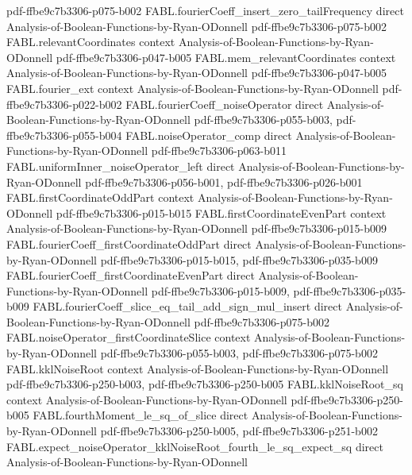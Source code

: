 \begin{theorem}
  {pdf-ffbe9c7b3306-p075-b002}
\proofstep
  {FABL.fourierCoeff_insert_zero_tailFrequency}
  {direct}
  {Analysis-of-Boolean-Functions-by-Ryan-ODonnell}
  {pdf-ffbe9c7b3306-p075-b002}
\proofstep
  {FABL.relevantCoordinates}
  {context}
  {Analysis-of-Boolean-Functions-by-Ryan-ODonnell}
  {pdf-ffbe9c7b3306-p047-b005}
\proofstep
  {FABL.mem_relevantCoordinates}
  {context}
  {Analysis-of-Boolean-Functions-by-Ryan-ODonnell}
  {pdf-ffbe9c7b3306-p047-b005}
\proofstep
  {FABL.fourier_ext}
  {context}
  {Analysis-of-Boolean-Functions-by-Ryan-ODonnell}
  {pdf-ffbe9c7b3306-p022-b002}
\proofstep
  {FABL.fourierCoeff_noiseOperator}
  {direct}
  {Analysis-of-Boolean-Functions-by-Ryan-ODonnell}
  {pdf-ffbe9c7b3306-p055-b003,
    pdf-ffbe9c7b3306-p055-b004}
\proofstep
  {FABL.noiseOperator_comp}
  {direct}
  {Analysis-of-Boolean-Functions-by-Ryan-ODonnell}
  {pdf-ffbe9c7b3306-p063-b011}
\proofstep
  {FABL.uniformInner_noiseOperator_left}
  {direct}
  {Analysis-of-Boolean-Functions-by-Ryan-ODonnell}
  {pdf-ffbe9c7b3306-p056-b001,
    pdf-ffbe9c7b3306-p026-b001}
\proofstep
  {FABL.firstCoordinateOddPart}
  {context}
  {Analysis-of-Boolean-Functions-by-Ryan-ODonnell}
  {pdf-ffbe9c7b3306-p015-b015}
\proofstep
  {FABL.firstCoordinateEvenPart}
  {context}
  {Analysis-of-Boolean-Functions-by-Ryan-ODonnell}
  {pdf-ffbe9c7b3306-p015-b009}
\proofstep
  {FABL.fourierCoeff_firstCoordinateOddPart}
  {direct}
  {Analysis-of-Boolean-Functions-by-Ryan-ODonnell}
  {pdf-ffbe9c7b3306-p015-b015,
    pdf-ffbe9c7b3306-p035-b009}
\proofstep
  {FABL.fourierCoeff_firstCoordinateEvenPart}
  {direct}
  {Analysis-of-Boolean-Functions-by-Ryan-ODonnell}
  {pdf-ffbe9c7b3306-p015-b009,
    pdf-ffbe9c7b3306-p035-b009}
\proofstep
  {FABL.fourierCoeff_slice_eq_tail_add_sign_mul_insert}
  {direct}
  {Analysis-of-Boolean-Functions-by-Ryan-ODonnell}
  {pdf-ffbe9c7b3306-p075-b002}
\proofstep
  {FABL.noiseOperator_firstCoordinateSlice}
  {context}
  {Analysis-of-Boolean-Functions-by-Ryan-ODonnell}
  {pdf-ffbe9c7b3306-p055-b003,
    pdf-ffbe9c7b3306-p075-b002}
\proofstep
  {FABL.kklNoiseRoot}
  {context}
  {Analysis-of-Boolean-Functions-by-Ryan-ODonnell}
  {pdf-ffbe9c7b3306-p250-b003,
    pdf-ffbe9c7b3306-p250-b005}
\proofstep
  {FABL.kklNoiseRoot_sq}
  {context}
  {Analysis-of-Boolean-Functions-by-Ryan-ODonnell}
  {pdf-ffbe9c7b3306-p250-b005}
\proofstep
  {FABL.fourthMoment_le_sq_of_slice}
  {direct}
  {Analysis-of-Boolean-Functions-by-Ryan-ODonnell}
  {pdf-ffbe9c7b3306-p250-b005,
    pdf-ffbe9c7b3306-p251-b002}
\proofstep
  {FABL.expect_noiseOperator_kklNoiseRoot_fourth_le_sq_expect_sq}
  {direct}
  {Analysis-of-Boolean-Functions-by-Ryan-ODonnell}

\end{theorem}
